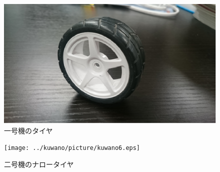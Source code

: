 \begin{figure}[t]
  \begin{center}
    \includegraphics[width=1.0\hsize]{../kuwano/picture/kuwano5.eps}
    \caption{一号機のタイヤ}
    \label{kuwano5}
  \end{center}
\end{figure}

\begin{figure}[t]
  \begin{center}
    \texttt{[image: ../kuwano/picture/kuwano6.eps]}
    \caption{二号機のナロータイヤ}
    \label{kuwano6}
  \end{center}
\end{figure}
